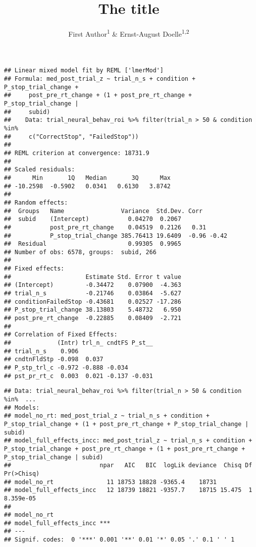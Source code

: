 \documentclass[
  man]{apa6}
\title{The title}
\author{First Author\textsuperscript{1} \& Ernst-August Doelle\textsuperscript{1,2}}
\date{}
\affiliation{\vspace{0.5cm}\textsuperscript{1} Wilhelm-Wundt-University\\\textsuperscript{2} Konstanz Business School}
\begin{document}
\maketitle

\begin{verbatim}
## Linear mixed model fit by REML ['lmerMod']
## Formula: med_post_trial_z ~ trial_n_s + condition + P_stop_trial_change +  
##     post_pre_rt_change + (1 + post_pre_rt_change + P_stop_trial_change |  
##     subid)
##    Data: trial_neural_behav_roi %>% filter(trial_n > 50 & condition %in%  
##     c("CorrectStop", "FailedStop"))
## 
## REML criterion at convergence: 18731.9
## 
## Scaled residuals: 
##      Min       1Q   Median       3Q      Max 
## -10.2598  -0.5902   0.0341   0.6130   3.8742 
## 
## Random effects:
##  Groups   Name                Variance  Std.Dev. Corr       
##  subid    (Intercept)           0.04270  0.2067             
##           post_pre_rt_change    0.04519  0.2126   0.31      
##           P_stop_trial_change 385.76413 19.6409  -0.96 -0.42
##  Residual                       0.99305  0.9965             
## Number of obs: 6578, groups:  subid, 266
## 
## Fixed effects:
##                     Estimate Std. Error t value
## (Intercept)         -0.34472    0.07900  -4.363
## trial_n_s           -0.21746    0.03864  -5.627
## conditionFailedStop -0.43681    0.02527 -17.286
## P_stop_trial_change 38.13803    5.48732   6.950
## post_pre_rt_change  -0.22885    0.08409  -2.721
## 
## Correlation of Fixed Effects:
##             (Intr) trl_n_ cndtFS P_st__
## trial_n_s    0.906                     
## cndtnFldStp -0.098  0.037              
## P_stp_trl_c -0.972 -0.888 -0.034       
## pst_pr_rt_c  0.003  0.021 -0.137 -0.031
\end{verbatim}

\begin{verbatim}
## Data: trial_neural_behav_roi %>% filter(trial_n > 50 & condition %in%  ...
## Models:
## model_no_rt: med_post_trial_z ~ trial_n_s + condition + P_stop_trial_change + (1 + post_pre_rt_change + P_stop_trial_change | subid)
## model_full_effects_incc: med_post_trial_z ~ trial_n_s + condition + P_stop_trial_change + post_pre_rt_change + (1 + post_pre_rt_change + P_stop_trial_change | subid)
##                         npar   AIC   BIC  logLik deviance  Chisq Df Pr(>Chisq)
## model_no_rt               11 18753 18828 -9365.4    18731                     
## model_full_effects_incc   12 18739 18821 -9357.7    18715 15.475  1  8.359e-05
##                            
## model_no_rt                
## model_full_effects_incc ***
## ---
## Signif. codes:  0 '***' 0.001 '**' 0.01 '*' 0.05 '.' 0.1 ' ' 1
\end{verbatim}
\end{document}

